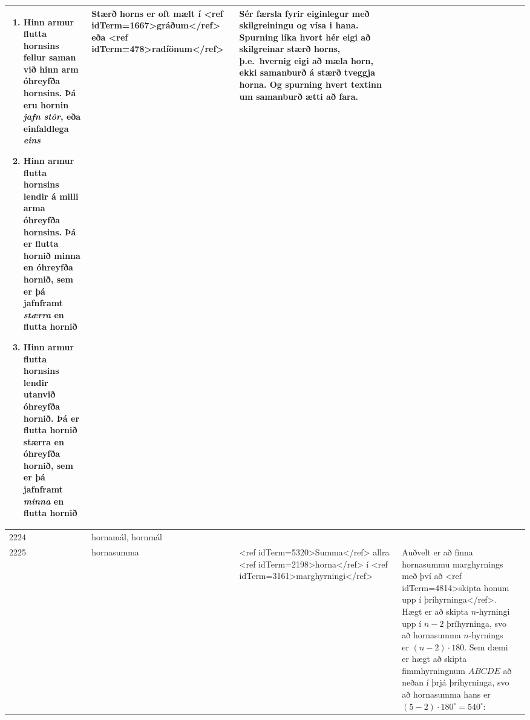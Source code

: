 \begin{longtable}{p{}|p{}|p{}|p{}|p{}}
\begin{enumerate}
    \item Hinn armur flutta hornsins fellur saman við hinn arm óhreyfða hornsins. Þá eru hornin \textit{jafn stór}, eða einfaldlega \textit{eins}
    \item Hinn armur flutta hornsins lendir á milli arma óhreyfða hornsins. Þá er flutta hornið minna en óhreyfða hornið, sem er þá jafnframt \textit{stærra} en flutta hornið
    \item Hinn armur flutta hornsins lendir utanvið óhreyfða hornið. Þá er flutta hornið stærra en óhreyfða hornið, sem er þá jafnframt \textit{minna} en flutta hornið
\end{enumerate} & Stærð horns er oft mælt í <ref idTerm=1667>gráðum</ref> eða <ref idTerm=478>radíönum</ref> & Sér færsla fyrir eiginlegur með skilgreiningu og vísa i hana. Spurning líka hvort hér eigi að skilgreinar stærð horns, þ.e.~hvernig eigi að mæla horn, ekki samanburð á stærð tveggja horna. Og spurning hvert textinn um samanburð ætti að fara. \\
\hline
2224 & hornamál, hornmál &  &  &  \\
\hline
2225 & hornasumma & <ref idTerm=5320>Summa</ref> allra <ref idTerm=2198>horna</ref> í <ref idTerm=3161>marghyrningi</ref>  & Auðvelt er að finna hornasummu marghyrnings með því að <ref idTerm=4814>skipta honum upp í þríhyrninga</ref>. Hægt er að skipta $n$-hyrningi upp í $n-2$ þríhyrninga, svo að hornasumma $n$-hyrnings er $(n-2)\cdot 180$. Sem dæmi er hægt að skipta fimmhyrningnum $A B C D E$ að neðan í þrjá þríhyrninga, svo að hornasumma hans er $(5 - 2) \cdot 180^\circ = 540^\circ$:


\end{longtable}
